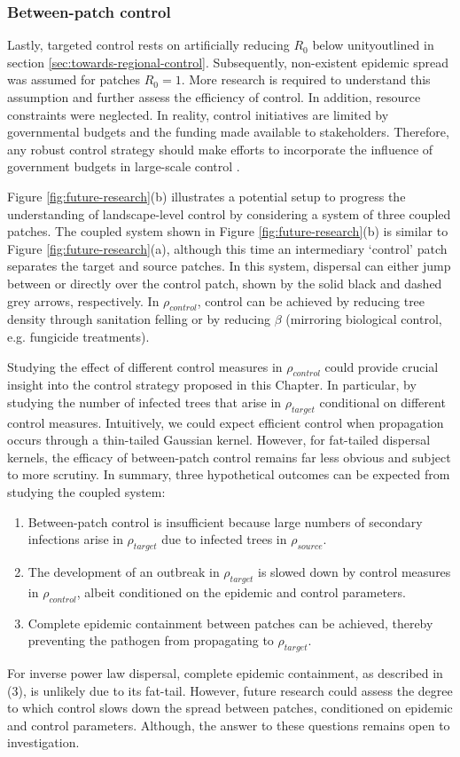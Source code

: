 \subsubsection{Between-patch control}

Lastly, targeted control rests on artificially reducing $R_0$ below unity\textemdash outlined in section \ref{sec:towards-regional-control}.
Subsequently, non-existent epidemic spread was assumed for patches $R_0=1$.
More research is required to understand this assumption and further assess the efficiency of control.
In addition, resource constraints were neglected. In reality, control initiatives are limited by governmental budgets and the funding made available to stakeholders.
Therefore, any robust control strategy should make efforts to incorporate the influence of government budgets in large-scale control \cite{large-scale-control}.

Figure \ref{fig:future-research}(b) illustrates a potential setup to progress the understanding of landscape-level control by considering a system of three coupled patches.
The coupled system shown in Figure \ref{fig:future-research}(b) is similar to Figure \ref{fig:future-research}(a), although this time an intermediary `control' patch separates the target and source patches. In this system, dispersal can either jump between or directly over the control patch, shown by the solid black and dashed grey arrows, respectively. In $\rho_{control}$, control can be achieved by reducing tree density through sanitation felling or by reducing $\beta$ (mirroring biological control, e.g. fungicide treatments).

Studying the effect of different control measures in $\rho_{control}$ could provide crucial insight into the control strategy proposed in this Chapter.
In particular, by studying the number of infected trees that arise in $\rho_{target}$ conditional on different control measures. 
Intuitively, we could expect efficient control when propagation occurs through a thin-tailed Gaussian kernel.
However, for fat-tailed dispersal kernels, the efficacy of between-patch control remains far less obvious and subject to more scrutiny.
In summary, three hypothetical outcomes can be expected from studying the coupled system: 
\begin{enumerate}
    \item Between-patch control is insufficient because large numbers of secondary infections arise in $\rho_{target}$ due to infected trees in $\rho_{source}$.
    \item The development of an outbreak in $\rho_{target}$ is slowed down by control measures in $\rho_{control}$, albeit conditioned on the epidemic and control parameters.
    \item Complete epidemic containment between patches can be achieved, thereby preventing the pathogen from propagating to $\rho_{target}$.
\end{enumerate}
For inverse power law dispersal, complete epidemic containment, as described in (3), is unlikely due to its fat-tail.
However, future research could assess the degree to which control slows down the spread between patches, conditioned on epidemic and control parameters. Although, the answer to these questions remains open to investigation.

\newpage












